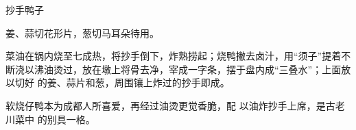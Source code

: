 \begin{recipe}{抄手鸭子}

\ingredients


\preparation

\step 姜、蒜切花形片，葱切马耳朵待用。

\step 菜油在锅内烧至七成热，将抄手倒下，炸熟捞起；烧鸭撇去卤汁，用“须子”提着不
断浇以沸油烫过，放在墩上将骨去净，宰成一字条，摆于盘内成“三叠水”；上面放以切好
的姜、蒜片和葱，周围镶上炸过的抄手即成。

\features

软烧仔鸭本为成都人所喜爱，再经过油烫更觉香脆，配 以油炸抄手上席，是古老川菜中
的别具一格。

\end{recipe}

